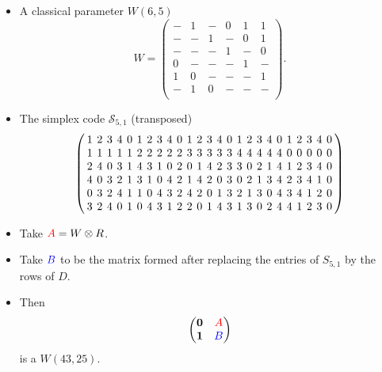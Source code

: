 \documentclass{beamer}
\newcommand{\rred}[1]{\textcolor{red}{#1}}
\newcommand{\bblue}[1]{\textcolor{blue}{#1}}
\begin{document}
\begin{frame}

  \begin{itemize}
  \item A classical parameter $W(6,5)$
    \[
      W =
      \begin{pmatrix}
        -&1&-&0&1&1\\
        -&-&1&-&0&1\\
        -&-&-&1&-&0\\
        0&-&-&-&1&-\\
        1&0&-&-&-&1\\
        -&1&0&-&-&-\\
      \end{pmatrix}.
    \]
  \item The simplex code $\mathcal{S}_{5,1}$ (transposed)
    \[
      \left(
        \arraycolsep=2.0pt\def\arraystretch{1.0}
        \begin{array}{ccccccccccccccccccccccccc}
          1&2&3&4&0&1&2&3&4&0&1&2&3&4&0&1&2&3&4&0&1&2&3&4&0\\
          1&1&1&1&1&2&2&2&2&2&3&3&3&3&3&4&4&4&4&4&0&0&0&0&0\\
          2&4&0&3&1&4&3&1&0&2&0&1&4&2&3&3&0&2&1&4&1&2&3&4&0\\
          4&0&3&2&1&3&1&0&4&2&1&4&2&0&3&0&2&1&3&4&2&3&4&1&0\\
          0&3&2&4&1&1&0&4&3&2&4&2&0&1&3&2&1&3&0&4&3&4&1&2&0\\
          3&2&4&0&1&0&4&3&1&2&2&0&1&4&3&1&3&0&2&4&4&1&2&3&0\\
        \end{array}
      \right)
    \]
  \end{itemize}
  
\end{frame}

\begin{frame}

  \begin{itemize}
  \item Take $\rred{A}=W \otimes R$.
  \item Take $\bblue{B}$ to be the matrix formed after replacing the entries of
    $S_{5,1}$ by the rows of $D$.
  \item Then
    \[
      \begin{pmatrix}
        \textbf{0} & \rred{A} \\
        \textbf{1} & \bblue{B}
      \end{pmatrix}
    \]
    is a $W(43,25)$.
  \end{itemize}
  
\end{frame}
\end{document}
